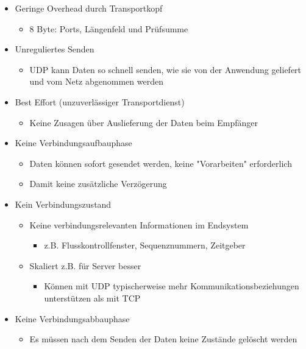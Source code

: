     \begin{itemize}
      \item Geringe Overhead durch Transportkopf
        \begin{itemize}
          \item 8 Byte: Ports, Längenfeld und Prüfsumme
        \end{itemize}
      \item Unreguliertes Senden
        \begin{itemize}
          \item UDP kann Daten so schnell senden, wie sie von der Anwendung geliefert und vom Netz
            abgenommen werden
        \end{itemize}
      \item Best Effort (unzuverlässiger Transportdienst)
        \begin{itemize}
          \item Keine Zusagen über Auslieferung der Daten beim Empfänger
        \end{itemize}
      \item Keine Verbindungsaufbauphase
        \begin{itemize}
          \item Daten können sofort gesendet werden, keine "Vorarbeiten" erforderlich
          \item Damit keine zusätzliche Verzögerung
        \end{itemize}
      \item Kein Verbindungszustand
        \begin{itemize}
          \item Keine verbindungsrelevanten Informationen im Endsystem
            \begin{itemize}
              \item z.B. Flusskontrollfenster, Sequenznummern, Zeitgeber
            \end{itemize}
          \item Skaliert z.B. für Server besser
            \begin{itemize}
              \item Können mit UDP typischerweise mehr Kommunikationsbeziehungen unterstützen als mit
                TCP
            \end{itemize}
        \end{itemize}
      \item Keine Verbindungsabbauphase
        \begin{itemize}
          \item Es müssen nach dem Senden der Daten keine Zustände gelöscht werden
        \end{itemize}
    \end{itemize}
